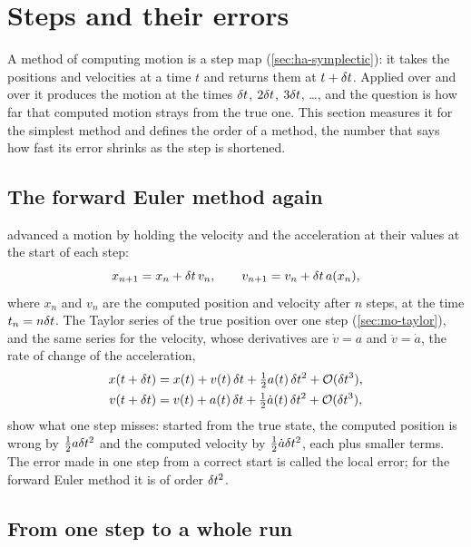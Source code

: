 \section{Steps and their errors}
\label{sec:in-steps}

A method of computing motion is a step map (\cref{sec:ha-symplectic}): it
takes the positions and velocities at a time $t$ and returns them at $t
+ \delta t$. Applied over and over it produces the motion at the times $\delta t$,
$2\delta t$, $3\delta t$, \dots, and the question is how far that computed motion
strays from the true one. This section measures it for the simplest
method and defines the order of a method, the number that says how fast
its error shrinks as the step is shortened.

\subsection*{The forward Euler method again}

 advanced a motion by holding the velocity and the
acceleration at their values at the start of each step:
\begin{equation*}
   x_{n+1} = x_n + \delta t\,v_n , \qquad v_{n+1} = v_n + \delta t\,a(x_n) ,
\end{equation*}
where $x_n$ and $v_n$ are the computed position and velocity after $n$
steps, at the time $t_n = n\delta t$. The Taylor series of the true position
over one step (\cref{sec:mo-taylor}), and the same series for the
velocity, whose derivatives are $\dot{v} = a$ and $\ddot{v} = \dot{a}$, the
rate of change of the acceleration,
\begin{align*}
   x(t + \delta t) &= x(t) + v(t)\,\delta t + \tfrac12 a(t)\,\delta t^2 + \mathcal{O}(\delta t^3) ,\\
   v(t + \delta t) &= v(t) + a(t)\,\delta t + \tfrac12\dot{a}(t)\,\delta t^2
   + \mathcal{O}(\delta t^3) ,
\end{align*}
show what one step misses: started from the true state, the computed
position is wrong by $\frac12 a\delta t^2$ and the computed velocity by
$\frac12\dot{a}\delta t^2$, each plus smaller terms. The error made in one step
from a correct start is called the local error; for the forward Euler
method it is of order $\delta t^2$.

\subsection*{From one step to a whole run}

